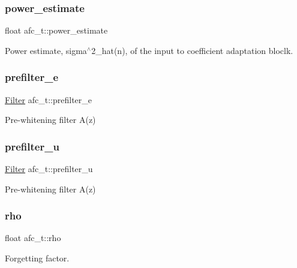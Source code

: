 \subsubsection{\texorpdfstring{power\+\_\+estimate}{power\_estimate}}
{\footnotesize\ttfamily float afc\+\_\+t\+::power\+\_\+estimate}



Power estimate, sigma$^\wedge$2\+\_\+hat(n), of the input to coefficient adaptation bloclk. 

\mbox{\label{structafc__t_a67b0483fc918fc9af5cb64c6b79e41cf}} 
\subsubsection{\texorpdfstring{prefilter\+\_\+e}{prefilter\_e}}
{\footnotesize\ttfamily \mbox{\hyperlink{filter_8h_a69e34b8aa259d2ca0b81b5c95f395bdf}{Filter}} afc\+\_\+t\+::prefilter\+\_\+e}



Pre-\/whitening filter A(z) 

\mbox{\label{structafc__t_a43d15e690ac1c74461c8b8a5522d8e52}} 
\subsubsection{\texorpdfstring{prefilter\+\_\+u}{prefilter\_u}}
{\footnotesize\ttfamily \mbox{\hyperlink{filter_8h_a69e34b8aa259d2ca0b81b5c95f395bdf}{Filter}} afc\+\_\+t\+::prefilter\+\_\+u}



Pre-\/whitening filter A(z) 

\mbox{\label{structafc__t_a8edae5604a2d189f1e83b71678566cad}} 
\subsubsection{\texorpdfstring{rho}{rho}}
{\footnotesize\ttfamily float afc\+\_\+t\+::rho}



Forgetting factor. 

